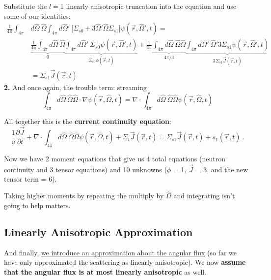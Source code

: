 \documentclass[12pt]{article}
\newcommand{\vOmega}{\ensuremath{\hat{\Omega}}}
\begin{document}
Substitute the $l=1$ linearly anisotropic truncation into the equation and use some of our identities:
%
\begin{align*}
\frac{1}{4\pi} \int_{4\pi}  &d\vOmega
\: \vOmega  \int_{4\pi} d\vOmega'\: \bigl[\Sigma_{s0} + 3\vOmega' \vOmega \Sigma_{s1} \bigr] \psi(\vec{r}, \vOmega', t) = \nonumber\\
%
& \underbrace{\frac{1}{4\pi} \int_{4\pi} d\vOmega \:\vOmega}_{0}  \underbrace{\int_{4\pi} d\vOmega'\:  \Sigma_{s0}\psi(\vec{r}, \vOmega', t)}_{\Sigma_{s0} \phi(\vec{r},t)} +
%
\frac{1}{4\pi} \underbrace{\int_{4\pi} d\vOmega \:\vOmega \vOmega}_{4\pi/3 } \underbrace{\int_{4\pi} d\vOmega'\: \vOmega' 3  \Sigma_{s1}\psi(\vec{r}, \vOmega', t)}_{3\Sigma_{s1} \vec{J}(\vec{r},t)} \\
%
&= \boxed{\Sigma_{s1} \vec{J}(\vec{r},t)}
\end{align*}
\textbf{2.} And once again, the trouble term: streaming
%
\[\int_{4\pi} d\vOmega \:\vOmega \vOmega \cdot \nabla \psi(\vec{r}, \vOmega, t) = \nabla \cdot \int_{4\pi} d\vOmega \:\vOmega \vOmega \psi(\vec{r}, \vOmega, t) \]

\vspace*{2em}
All together this is the \textbf{current continuity equation}:
\begin{equation}
\frac{1}{v}\frac{\partial \vec{J}}{\partial t} 
+ \nabla \cdot \int_{4\pi} d\vOmega \:\vOmega \vOmega \psi(\vec{r}, \vOmega, t) +
\Sigma_t  \vec{J}(\vec{r}, t) =
\Sigma_{s1} \vec{J}(\vec{r},t)
+ s_{1}(\vec{r}, t) \:.
\label{eq:currentcont}
\end{equation}

Now we have 2 moment equations that give us 4 total equations (neutron continuity and 3 tensor equations) and 10 unknowns ($\phi$ = 1, $\vec{J}$ = 3, and the new tensor term = 6). 

Taking higher moments by repeating the multiply by $\vOmega$ and integrating isn't going to help matters.


\subsection*{Linearly Anisotropic Approximation}
And finally, \underline{we introduce an approximation about the angular flux} (so far we have only approximated the scattering as linearly anisotropic). We now \textbf{assume that the angular flux is at most linearly anisotropic} as well.
\end{document}
